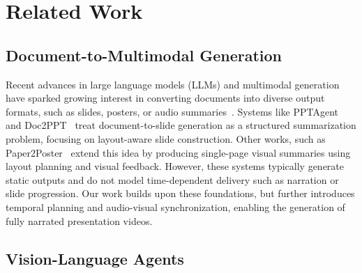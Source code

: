 \documentclass[11pt]{article}
\begin{document}
\section{Related Work}

\subsection{Document-to-Multimodal Generation}

Recent advances in large language models (LLMs) and multimodal generation have sparked growing interest in converting documents into diverse output formats, such as slides, posters, or audio summaries~\cite{xu2025qwen2,wang2025infinity,pang2025paper2poster,sun2024genesis}. Systems like PPTAgent~\cite{zheng2025pptagent} and Doc2PPT~\cite{fu2022doc2ppt} treat document-to-slide generation as a structured summarization problem, focusing on layout-aware slide construction. Other works, such as Paper2Poster~\cite{pang2025paper2poster} extend this idea by producing single-page visual summaries using layout planning and visual feedback. However, these systems typically generate static outputs and do not model time-dependent delivery such as narration or slide progression. Our work builds upon these foundations, but further introduces temporal planning and audio-visual synchronization, enabling the generation of fully narrated presentation videos.


\subsection{Vision-Language Agents}
\end{document}
